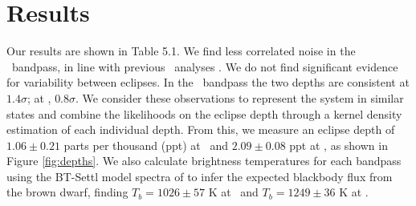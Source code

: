\section{Results}

Our results are shown in Table 5.1. 
We find less correlated noise in the \irb\ bandpass, in line with
previous \spitz\ analyses \citep{Hora08}.
We do not find significant evidence for variability between eclipses.
In the \ira\ bandpass the two depths are consistent at $1.4 \sigma$;
at \irb, $0.8\sigma$.
We consider these observations to represent the system in similar states
and combine the likelihoods on the eclipse depth through a kernel density
estimation of each individual depth.
From this, we measure an eclipse depth of $1.06 \pm 0.21$ parts per thousand (ppt) at \ira\ and $2.09 \pm 0.08$ ppt
at \irb, as shown in Figure \ref{fig:depths}.
We also calculate brightness temperatures for each bandpass using the BT-Settl model spectra of \citet{Allard12}
to infer the expected blackbody flux from the brown dwarf, finding $T_b = 1026 \pm 57$ K at \ira\ and $T_b = 
1249 \pm 36$ K at \irb.


